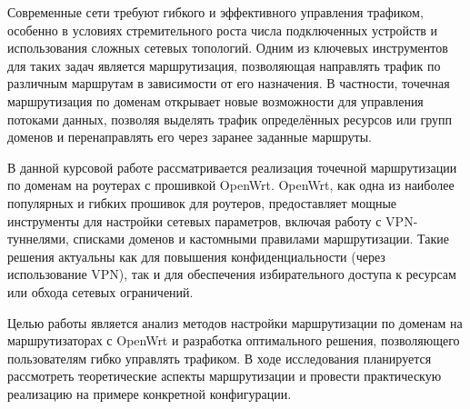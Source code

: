 \introduction %

Современные сети требуют гибкого и эффективного управления трафиком, особенно в условиях стремительного роста числа подключенных устройств и использования сложных сетевых топологий. Одним из ключевых инструментов для таких задач является маршрутизация, позволяющая направлять трафик по различным маршрутам в зависимости от его назначения. В частности, точечная маршрутизация по доменам открывает новые возможности для управления потоками данных, позволяя выделять трафик определённых ресурсов или групп доменов и перенаправлять его через заранее заданные маршруты.

В данной курсовой работе рассматривается реализация точечной маршрутизации по доменам на роутерах с прошивкой OpenWrt. OpenWrt, как одна из наиболее популярных и гибких прошивок для роутеров, предоставляет мощные инструменты для настройки сетевых параметров, включая работу с VPN-туннелями, списками доменов и кастомными правилами маршрутизации. Такие решения актуальны как для повышения конфиденциальности (через использование VPN), так и для обеспечения избирательного доступа к ресурсам или обхода сетевых ограничений.

Целью работы является анализ методов настройки маршрутизации по доменам на маршрутизаторах с OpenWrt и разработка оптимального решения, позволяющего пользователям гибко управлять трафиком. В ходе исследования планируется рассмотреть теоретические аспекты маршрутизации и провести практическую реализацию на примере конкретной конфигурации.

